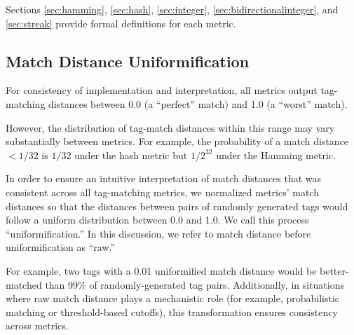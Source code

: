 
Sections \ref{sec:hamming}, \ref{sec:hash}, \ref{sec:integer}, \ref{sec:bidirectionalinteger}, and \ref{sec:streak} provide formal definitions for each metric.







\subsection{Match Distance Uniformification}
\label{sec:uniformification}



For consistency of implementation and interpretation, all metrics output tag-matching distances between 0.0 (a ``perfect'' match) and 1.0 (a ``worst'' match).

However, the distribution of tag-match distances within this range may vary substantially between metrics.
For example, the probability of a match distance $<1/32$ is $1/32$ under the hash metric but $1/2^{32}$ under the Hamming metric.

In order to ensure an intuitive interpretation of match distances that was consistent across all tag-matching metrics, we normalized metrics' match distances so that the distances between pairs of randomly generated tags would follow a uniform distribution between 0.0 and 1.0.
We call this process ``uniformification.''
In this discussion, we refer to match distance before uniformification as ``raw.''

For example, two tags with a 0.01 uniformified match distance would be better-matched than 99\% of randomly-generated tag pairs.
Additionally, in situations where raw match distance plays a mechanistic role (for example, probabilistic matching or threshold-based cutoffs), this transformation ensures consistency across metrics.

